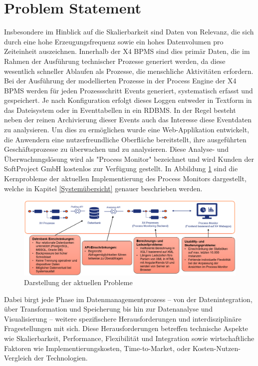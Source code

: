 \section{Problem Statement}
Insbesondere im Hinblick auf die Skalierbarkeit sind Daten von Relevanz, die sich durch eine hohe Erzeugungsfrequenz sowie ein hohes Datenvolumen pro Zeiteinheit auszeichnen. Innerhalb der X4 BPMS sind dies primär Daten, die im Rahmen der Ausführung technischer Prozesse generiert werden, da diese wesentlich schneller Ablaufen als Prozesse, die menschliche Aktivitäten erfordern. Bei der Ausführung der modellierten Prozesse in der Process Engine der X4 BPMS werden für jeden Prozessschritt Events generiert, systematisch erfasst und gespeichert. Je nach Konfiguration erfolgt dieses Loggen entweder in Textform in das Dateisystem oder in Eventtabellen in ein RDBMS. In der Regel besteht neben der reinen Archivierung dieser Events auch das Interesse diese Eventdaten zu analysieren. Um dies zu ermöglichen wurde eine Web-Applikation entwickelt, die Anwendern eine nutzerfreundliche Oberfläche bereitstellt, ihre ausgeführten Geschäftsprozesse zu überwachen und zu analysieren. Diese Analyse- und Überwachungslösung wird als "Process Monitor" bezeichnet und wird Kunden der SoftProject GmbH kostenlos zur Verfügung gestellt.\cite{softprojectgmbh-ProcessMonitor-Webseite}
In Abbildung \ref{fig:Problemstellung} sind die Kernprobleme der aktuellen Implementierung des Process Monitors dargestellt, welche in Kapitel \ref{Systemübersicht} genauer beschrieben werden.
\begin{figure}
    \centering
    \includegraphics[width=1\linewidth]{Grafiken/Problemstellung.png}
    \caption{Darstellung der aktuellen Probleme}
    \label{fig:Problemstellung}
\end{figure}

Dabei birgt jede Phase im Datenmanagementprozess – von der Datenintegration, über Transformation und Speicherung bis hin zur Datenanalyse und Visualisierung – weitere spezifischere Herausforderungen und interdisziplinäre Fragestellungen mit sich. Diese Herausforderungen betreffen technische Aspekte wie Skalierbarkeit, Performance, Flexibilität und Integration sowie wirtschaftliche Faktoren wie Implementierungskosten, Time-to-Market, oder Kosten-Nutzen-Vergleich der Technologien.

